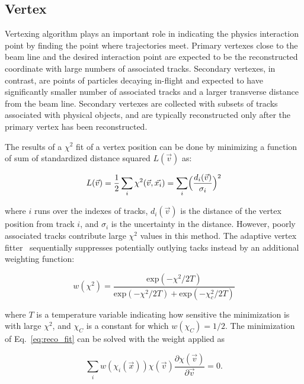 \subsection{Vertex}
Vertexing algorithm plays an important role in indicating the physics interaction point by finding the point where trajectories meet.
Primary vertexes close to the beam line and the desired interaction point are expected to be the reconstructed coordinate with large numbers of associated tracks.
Secondary vertexes, in contrast, are points of particles decaying in-flight and expected to have significantly smaller number of associated tracks and a larger transverse distance from the beam line.
Secondary vertexes are collected with subsets of tracks associated with physical objects, and are typically reconstructed only after the primary vertex has been reconstructed.

The results of a $\chi^2$ fit of a vertex position can be done by minimizing a function of sum of standardized distance squared $L(\vec{v})$ as:
\begin{linenomath}\begin{equation}\label{eq:reco_fit}
    L(\vec{v}) = \frac{1}{2} \sum_i \chi^2(\vec{v}, \vec{x_i}) = \sum_i \Bigl( \frac{d_i(\vec{v})}{\sigma_i} \Bigr)^2
\end{equation}\end{linenomath}
where $i$ runs over the indexes of tracks, $d_i(\vec{v})$ is the distance of the vertex position from track $i$, and $\sigma_i$ is the uncertainty in the distance.
However, poorly associated tracks contribute large $\chi^2$ values in this method.
The adaptive vertex fitter~\cite{Fruhwirth:2007hz} sequentially suppresses potentially outlying tacks instead by an additional weighting function:
\begin{linenomath}\begin{equation}\label{eq:reco_weight}
    w(\chi^2) = \frac{\mathrm{exp}(-\chi^2/2T)}{\mathrm{exp}(-\chi^2/2T)+\mathrm{exp}(-\chi^2_c/2T)}
\end{equation}\end{linenomath}
where $T$ is a temperature variable indicating how sensitive the minimization is with large $\chi^2$, and $\chi_C$ is a constant for which $w(\chi_C)=1/2$.
The minimization of Eq.~\ref{eq:reco_fit} can be solved with the weight applied as 
\begin{linenomath}\begin{equation}\label{eq:reco_temp}
    \sum_i w(\chi_i(\vec{x}))\chi(\vec{v})\frac{\partial\chi(\vec{v})}{\partial\vec{v}} = 0.
\end{equation}\end{linenomath}

